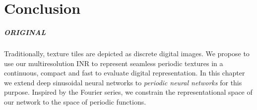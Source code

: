 



\chapter{Conclusion}




\paragraph{ORIGINAL}
Traditionally, texture tiles are depicted as discrete digital images. We propose to use our multiresolution INR to represent seamless periodic textures in a continuous, compact and fast to evaluate digital representation. In this chapter we extend deep sinusoidal neural networks to \textit{periodic neural networks} for this purpose. Inspired by the Fourier series, we constrain the representational space of our network to the space of periodic functions.

